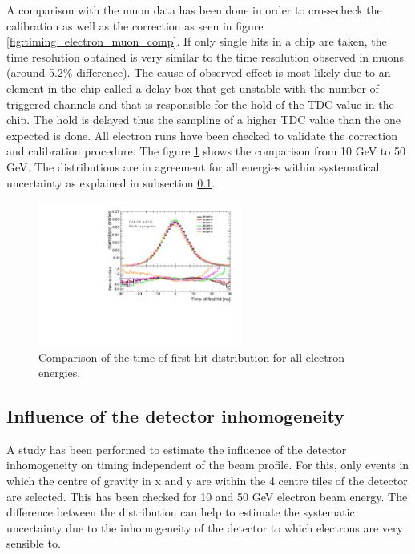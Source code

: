 A comparison with the muon data has been done in order to cross-check the calibration as well as the correction as seen in figure \ref{fig:timing_electron_muon_comp}. If only single hits in a chip are taken, the time resolution obtained is very similar to the time resolution observed in muons (around 5.2\% difference). The cause of observed effect is most likely due to an element in the chip called a delay box that get unstable with the number of triggered channels and that is responsible for the hold of the TDC value in the chip. The hold is delayed thus the sampling of a higher TDC value than the one expected is done. All electron runs have been checked to validate the correction and calibration procedure. The figure \ref{fig:all_electron_energies} shows the comparison from 10 GeV to 50 GeV. The distributions are in agreement for all energies within systematical uncertainty as explained in subsection \ref{subsec:det_inhomo}.

\begin{figure}[htbp!]
	\centering
	\includegraphics[width=0.6\textwidth]{chap5/fig_AHCAL_timing/Electrons/ComparisonDataEnergies.pdf}
	\caption{Comparison of the time of first hit distribution for all electron energies.}
	\label{fig:all_electron_energies}
\end{figure}

\subsection{Influence of the detector inhomogeneity}
\label{subsec:det_inhomo}

A study has been performed to estimate the influence of the detector inhomogeneity on timing independent of the beam profile. For this, only events in which the centre of gravity in x and y are within the 4 centre tiles of the detector are selected. This has been checked for 10 and 50 GeV electron beam energy. The difference between the distribution can help to estimate the systematic uncertainty due to the inhomogeneity of the detector to which electrons are very sensible to.

